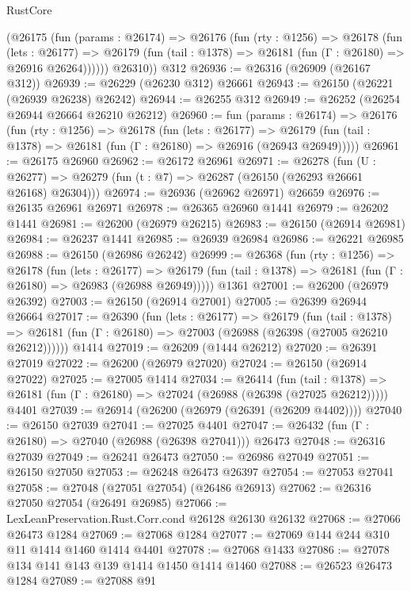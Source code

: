 \begin{lexlean}{RustCore}
\begin{coremodule}
        (@26175
          (fun (params : @26174) =>
          @26176
            (fun (rty : @1256) =>
            @26178
              (fun (lets : @26177) =>
              @26179 (fun (tail : @1378) => @26181 (fun (Γ : @26180) => @26916 @26264))))))
        @26310))
    @312
@26936 := @26316 (@26909 (@26167 @312))
@26939 := @26229 (@26230 @312) @26661
@26943 := @26150 (@26221 (@26939 @26238) @26242)
@26944 := @26255 @312
@26949 := @26252 (@26254 @26944 @26664 @26210 @26212)
@26960 := fun (params : @26174) =>
  @26176
    (fun (rty : @1256) =>
    @26178
      (fun (lets : @26177) =>
      @26179 (fun (tail : @1378) => @26181 (fun (Γ : @26180) => @26916 (@26943 @26949)))))
@26961 := @26175 @26960
@26962 := @26172 @26961
@26971 := @26278
    (fun (U : @26277) => @26279 (fun (t : @7) => @26287 (@26150 (@26293 @26661 @26168) @26304)))
@26974 := @26936 (@26962 @26971) @26659
@26976 := @26135 @26961 @26971
@26978 := @26365 @26960 @1441
@26979 := @26202 @1441
@26981 := @26200 (@26979 @26215)
@26983 := @26150 (@26914 @26981)
@26984 := @26237 @1441
@26985 := @26939 @26984
@26986 := @26221 @26985
@26988 := @26150 (@26986 @26242)
@26999 := @26368
    (fun (rty : @1256) =>
    @26178
      (fun (lets : @26177) =>
      @26179 (fun (tail : @1378) => @26181 (fun (Γ : @26180) => @26983 (@26988 @26949)))))
    @1361
@27001 := @26200 (@26979 @26392)
@27003 := @26150 (@26914 @27001)
@27005 := @26399 @26944 @26664
@27017 := @26390
    (fun (lets : @26177) =>
    @26179
      (fun (tail : @1378) =>
      @26181 (fun (Γ : @26180) => @27003 (@26988 (@26398 (@27005 @26210 @26212))))))
    @1414
@27019 := @26209 (@1444 @26212)
@27020 := @26391 @27019
@27022 := @26200 (@26979 @27020)
@27024 := @26150 (@26914 @27022)
@27025 := @27005 @1414
@27034 := @26414
    (fun (tail : @1378) => @26181 (fun (Γ : @26180) => @27024 (@26988 (@26398 (@27025 @26212)))))
    @4401
@27039 := @26914 (@26200 (@26979 (@26391 (@26209 @4402))))
@27040 := @26150 @27039
@27041 := @27025 @4401
@27047 := @26432 (fun (Γ : @26180) => @27040 (@26988 (@26398 @27041))) @26473
@27048 := @26316 @27039
@27049 := @26241 @26473
@27050 := @26986 @27049
@27051 := @26150 @27050
@27053 := @26248 @26473 @26397
@27054 := @27053 @27041
@27058 := @27048 (@27051 @27054) (@26486 @26913)
@27062 := @26316 @27050 @27054 (@26491 @26985)
@27066 := LexLeanPreservation.Rust.Corr.cond @26128 @26130 @26132
@27068 := @27066 @26473 @1284
@27069 := @27068 @1284
@27077 := @27069 @144 @244 @310 @11 @1414 @1460 @1414 @4401
@27078 := @27068 @1433
@27086 := @27078 @134 @141 @143 @139 @1414 @1450 @1414 @1460
@27088 := @26523 @26473 @1284
@27089 := @27088 @91

\end{coremodule}
\end{lexlean}
